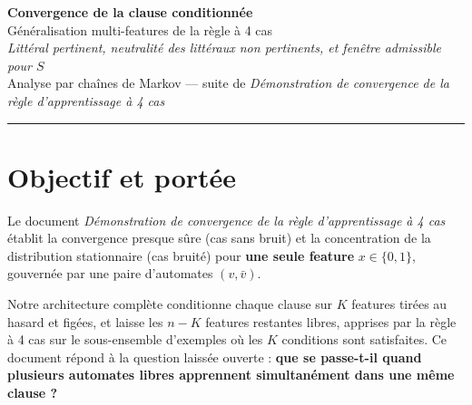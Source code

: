 \documentclass[12pt,a4paper]{article}
\theoremstyle{remark}
\newcommand{\vbar}{\bar{v}}
\begin{document}

\begin{center}
  {\LARGE\bfseries Convergence de la clause conditionnée}\\[6pt]
  {\large Généralisation multi-features de la règle à 4 cas}\\[4pt]
  {\large\itshape Littéral pertinent, neutralité des littéraux non pertinents,
  et fenêtre admissible pour $S$}\\[12pt]
  {\normalsize Analyse par chaînes de Markov --- suite de
  \textit{Démonstration de convergence de la règle d'apprentissage à 4 cas}}
\end{center}

\vspace{1em}
\hrule
\vspace{1.5em}

\tableofcontents

\newpage

\section{Objectif et portée}

Le document \textit{Démonstration de convergence de la règle d'apprentissage à 4 cas}
établit la convergence presque sûre (cas sans bruit) et la concentration de la
distribution stationnaire (cas bruité) pour \textbf{une seule feature} $x\in\{0,1\}$,
gouvernée par une paire d'automates $(v,\vbar)$.

Notre architecture complète conditionne chaque clause sur $K$ features tirées au
hasard et figées, et laisse les $n-K$ features restantes libres, apprises par la
règle à 4 cas sur le sous-ensemble d'exemples où les $K$ conditions sont satisfaites.
Ce document répond à la question laissée ouverte : \textbf{que se passe-t-il quand
plusieurs automates libres apprennent simultanément dans une même clause ?}
\end{document}
